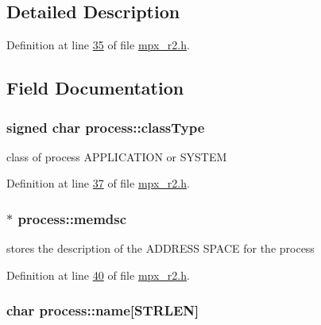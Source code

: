 \subsection{Detailed Description}


Definition at line \hyperlink{mpx__r2_8h_source_l00035}{35} of file \hyperlink{mpx__r2_8h_source}{mpx\_\-r2.h}.



\subsection{Field Documentation}
\hypertarget{structprocess_abe608249826d4a0f04fba4398f967047}{
\subsubsection[{classType}]{\setlength{\rightskip}{0pt plus 5cm}signed char {\bf process::classType}}}
\label{structprocess_abe608249826d4a0f04fba4398f967047}


class of process APPLICATION or SYSTEM 



Definition at line \hyperlink{mpx__r2_8h_source_l00037}{37} of file \hyperlink{mpx__r2_8h_source}{mpx\_\-r2.h}.

\hypertarget{structprocess_a163551ab7b60184b48e5d440fcd5c2b8}{
\subsubsection[{memdsc}]{$\ast$ {\bf process::memdsc}}}
\label{structprocess_a163551ab7b60184b48e5d440fcd5c2b8}


stores the description of the ADDRESS SPACE for the process 



Definition at line \hyperlink{mpx__r2_8h_source_l00040}{40} of file \hyperlink{mpx__r2_8h_source}{mpx\_\-r2.h}.

\hypertarget{structprocess_ab6613e7bde642a754f71b9f60053cd1a}{
\subsubsection[{name}]{\setlength{\rightskip}{0pt plus 5cm}char {\bf process::name}\mbox{[}STRLEN\mbox{]}}}
\label{structprocess_ab6613e7bde642a754f71b9f60053cd1a}


